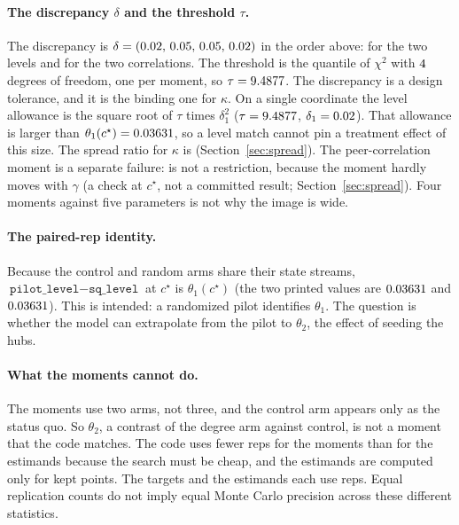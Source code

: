 \documentclass[11pt]{article}
\begin{document}
\paragraph{The discrepancy $\delta$ and the threshold $\tau$.}
The discrepancy is $\delta=(0.02,\,0.05,\,0.05,\,0.02)$ in the order above: \DeltaOne{} for the
two levels and \DeltaTwo{} for the two correlations.
The threshold is the \Confidence{} quantile of $\chi^2$ with $4$
degrees of freedom, one per moment, so $\tau=9.4877$.
The discrepancy is a design tolerance, and it is the binding one for
$\kappa$. On a single coordinate the level allowance is the square root of
$\tau$ times $\delta_1^2$ ($\tau=9.4877$, $\delta_1=0.02$). That allowance
is larger than $\theta_1(c^\star)=0.03631$, so a level match cannot
pin a treatment effect of this size. The spread ratio for $\kappa$ is
\SpreadRatioKappa{} (Section~\ref{sec:spread}). The peer-correlation moment
is a separate failure: \SpreadRatioGamma{} is not a restriction, because the
moment hardly moves with $\gamma$ (a check at $c^\star$, not a committed
result; Section~\ref{sec:spread}). Four moments against five parameters is
not why the image is wide.

\paragraph{The paired-rep identity.}
Because the control and random arms share their state streams,
$\texttt{pilot\_level}-\texttt{sq\_level}$ at $c^\star$ is $\theta_1(c^\star)$
(the two printed values are $0.03631$ and $0.03631$). This is
intended: a randomized pilot identifies $\theta_1$. The question is
whether the model can extrapolate from the pilot to $\theta_2$, the
effect of seeding the hubs.

\paragraph{What the moments cannot do.}
The moments use two arms, not three, and the control arm appears only as
the status quo. So $\theta_2$, a contrast of the degree arm against
control, is not a moment that the code matches. The code uses fewer
reps for the moments than for the estimands because the search must be
cheap, and the estimands are computed only for kept points. The targets
and the estimands each use \RepsEstimand{} reps. Equal replication
counts do not imply equal Monte Carlo precision across these different
statistics.
\end{document}
